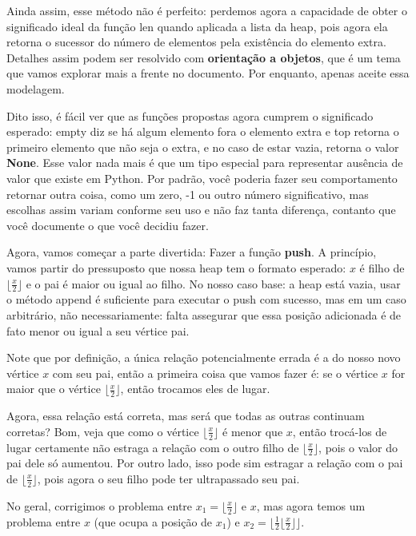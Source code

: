 \documentclass[11pt, a4paper]{article}
\begin{document}
Ainda assim, esse método não é perfeito: perdemos agora a capacidade de obter o significado ideal da função len quando aplicada a lista da heap, pois agora ela retorna o sucessor do número de elementos pela existência do elemento extra. Detalhes assim podem ser resolvido com \textbf{orientação a objetos}, que é um tema que vamos explorar mais a frente no documento. Por enquanto, apenas aceite essa modelagem.

Dito isso, é fácil ver que as funções propostas agora cumprem o significado esperado: empty diz se há algum elemento fora o elemento extra e top retorna o primeiro elemento que não seja o extra, e no caso de estar vazia, retorna o valor \textbf{None}. Esse valor nada mais é que um tipo especial para representar ausência de valor que existe em Python. Por padrão, você poderia fazer seu comportamento retornar outra coisa, como um zero, -1 ou outro número significativo, mas escolhas assim variam conforme seu uso e não faz tanta diferença, contanto que você documente o que você decidiu fazer.

Agora, vamos começar a parte divertida: Fazer a função \textbf{push}. A princípio, vamos partir do pressuposto que nossa heap tem o formato esperado: \(x\) é filho de \(\lfloor \frac{x}{2} \rfloor\) e o pai é maior ou igual ao filho. No nosso caso base: a heap está vazia, usar o método append é suficiente para executar o push com sucesso, mas em um caso arbitrário, não necessariamente: falta assegurar que essa posição adicionada é de fato menor ou igual a seu vértice pai.

Note que por definição, a única relação potencialmente errada é a do nosso novo vértice \(x\) com seu pai, então a primeira coisa que vamos fazer é: se o vértice \(x\) for maior que o vértice \(\lfloor \frac{x}{2} \rfloor\), então trocamos eles de lugar.

Agora, essa relação está correta, mas será que todas as outras continuam corretas? Bom, veja que como o vértice \(\lfloor \frac{x}{2} \rfloor\) é menor que \(x\), então trocá-los de lugar certamente não estraga a relação com o outro filho de \(\lfloor \frac{x}{2} \rfloor\), pois o valor do pai dele só aumentou. Por outro lado, isso pode sim estragar a relação com o pai de \(\lfloor \frac{x}{2} \rfloor\), pois agora o seu filho pode ter ultrapassado seu pai.

No geral, corrigimos o problema entre \(x_1=\lfloor \frac{x}{2} \rfloor\) e \(x\), mas agora temos um problema entre \(x\) (que ocupa a posição de \(x_1\)) e \(x_2=\lfloor \frac{1}{2}\lfloor \frac{x}{2} \rfloor\rfloor\). 
\end{document}
